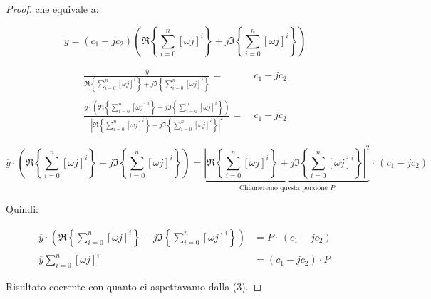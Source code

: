 \documentclass[11pt,italian]{article}
\theoremstyle{remark}
\begin{document}
\begin{proof}
    che equivale a:

    \[
        \overline{y} = (c_1 - j c_2) \left( \Re \left\{\sum_{i=0}^n \left[ \omega j \right]^i \right\} + j \Im \left\{ \sum_{i=0}^n \left[ \omega j \right]^i \right\} \right)
    \]

    \vspace{1em}

    \begin{align*}
        \frac
        {\overline{y}}
        { \Re \left\{\sum_{i=0}^n \left[ \omega j \right]^i \right\} + j \Im \left\{ \sum_{i=0}^n \left[ \omega j \right]^i \right\} } =
         & \ c_1 - j c_2  \\
        \\
        \frac
        {\overline{y} \cdot {\left( \Re \left\{\sum_{i=0}^n \left[ \omega j \right]^i \right\} - j \Im \left\{ \sum_{i=0}^n \left[ \omega j \right]^i \right\} \right)}}
        {\left| \Re \left\{\sum_{i=0}^n \left[ \omega j \right]^i \right\} + j \Im \left\{ \sum_{i=0}^n \left[ \omega j \right]^i \right\} \right|^2} =
         & \  c_1 - j c_2
    \end{align*}

    \begin{equation*}
        \overline{y} \cdot \left( \Re \left\{\sum_{i=0}^n \left[ \omega j \right]^i \right\} - j \Im \left\{ \sum_{i=0}^n \left[ \omega j \right]^i \right\} \right) =
        \underbrace{\left| \Re \left\{\sum_{i=0}^n \left[ \omega j \right]^i \right\} + j \Im \left\{ \sum_{i=0}^n \left[ \omega j \right]^i \right\} \right|^2}_{\mbox{Chiameremo questa porzione }P} \cdot\, (c_1 - j c_2)
    \end{equation*}

    Quindi:

    \begin{align*}
        \overline{y} \cdot \left( \Re \left\{\sum_{i=0}^n \left[ \omega j \right]^i \right\} - j \Im \left\{ \sum_{i=0}^n \left[ \omega j \right]^i \right\} \right) & = P \cdot\, (c_1 - j c_2) \\
        \overline{y} \sum_{i=0}^n \left[ \omega j \right]^i                                                                                                          & = (c_1 - j c_2) \cdot P
    \end{align*}

    Risultato coerente con quanto ci aspettavamo dalla (3).
\end{proof}
\end{document}
